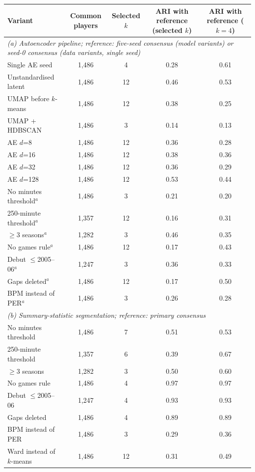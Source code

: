 \begin{tabular}{lcccc}\toprule
Variant & Common players & Selected $k$ & ARI with reference (selected $k$) & ARI with reference ($k=4$) \\ \midrule
\multicolumn{5}{l}{\textit{(a) Autoencoder pipeline; reference: five-seed consensus (model variants) or seed-0 consensus (data variants, single seed)}} \\
Single AE seed & 1,486 & 4 & 0.28 & 0.61 \\
Unstandardised latent & 1,486 & 12 & 0.46 & 0.53 \\
UMAP before $k$-means & 1,486 & 12 & 0.38 & 0.25 \\
UMAP + HDBSCAN & 1,486 & 3 & 0.14 & 0.13 \\
AE $d$=8 & 1,486 & 12 & 0.36 & 0.28 \\
AE $d$=16 & 1,486 & 12 & 0.38 & 0.36 \\
AE $d$=32 & 1,486 & 12 & 0.36 & 0.29 \\
AE $d$=128 & 1,486 & 12 & 0.53 & 0.44 \\
No minutes threshold$^a$ & 1,486 & 3 & 0.21 & 0.20 \\
250-minute threshold$^a$ & 1,357 & 12 & 0.16 & 0.31 \\
$\ge$3 seasons$^a$ & 1,282 & 3 & 0.46 & 0.35 \\
No games rule$^a$ & 1,486 & 12 & 0.17 & 0.43 \\
Debut $\le$2005--06$^a$ & 1,247 & 3 & 0.36 & 0.33 \\
Gaps deleted$^a$ & 1,486 & 12 & 0.17 & 0.50 \\
BPM instead of PER$^a$ & 1,486 & 3 & 0.26 & 0.28 \\
\midrule \multicolumn{5}{l}{\textit{(b) Summary-statistic segmentation; reference: primary consensus}} \\
No minutes threshold & 1,486 & 7 & 0.51 & 0.53 \\
250-minute threshold & 1,357 & 6 & 0.39 & 0.67 \\
$\ge$3 seasons & 1,282 & 3 & 0.50 & 0.60 \\
No games rule & 1,486 & 4 & 0.97 & 0.97 \\
Debut $\le$2005--06 & 1,247 & 4 & 0.93 & 0.93 \\
Gaps deleted & 1,486 & 4 & 0.89 & 0.89 \\
BPM instead of PER & 1,486 & 3 & 0.29 & 0.36 \\
Ward instead of $k$-means & 1,486 & 12 & 0.31 & 0.49 \\
\bottomrule\end{tabular}